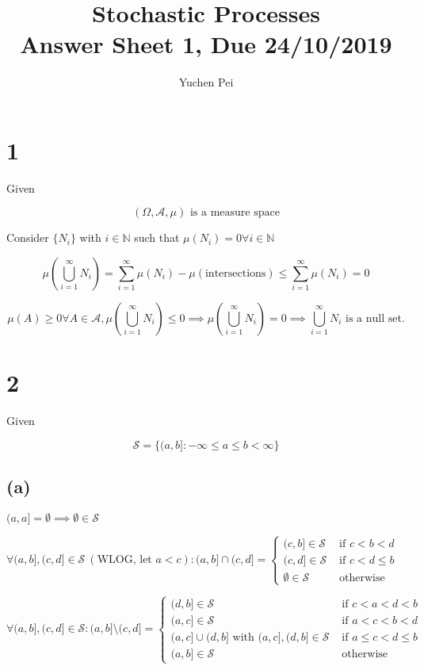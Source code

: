 

\title{Stochastic Processes\\{\small Answer Sheet 1, Due 24/10/2019}}
\author{Yuchen Pei}
\date{}


\maketitle




\section*{1}

Given

$$
(\Omega,\mathcal{A},\mu)\text{ is a measure space}
$$

Consider $\{N_i\}$ with $i\in\mathbb{N}$ such that $\mu(N_i)=0\forall i\in\mathbb{N}$

$$
\mu(\bigcup_{i=1}^{\infty}N_i)=\sum_{i=1}^{\infty}\mu(N_i)-\mu(\text{intersections})\leq\sum_{i=1}^{\infty}\mu(N_i)=0
$$

$$
\mu(A)\geq 0\forall A\in\mathcal{A},\mu(\bigcup_{i=1}^{\infty}N_i)\leq 0\implies\mu(\bigcup_{i=1}^{\infty}N_i)=0\implies \bigcup_{i=1}^{\infty}N_i\text{ is a null set.}
$$

\bigskip
\section*{2}

Given

$$
\mathcal{S}=\{
(a,b]:-\infty\leq a \leq b <\infty
\}
$$

\subsection*{(a)}

$(a,a]=\emptyset\implies\emptyset\in\mathcal{S}$

$
\forall(a,b],(c,d]\in\mathcal{S}\:(\text{WLOG, let }a<c):(a,b]\cap(c,d]=\left\{
\begin{array}{ll}
(c,b]\in\mathcal{S} &\text{ if }c<b<d
\\
(c,d]\in\mathcal{S} &\text{ if }c<d\leq b
\\
\emptyset\in\mathcal{S} &\text{ otherwise}
\end{array}
\right.
$

$
\forall(a,b],(c,d]\in\mathcal{S}:(a,b]\setminus(c,d]=\left\{
\begin{array}{ll}
(d,b]\in\mathcal{S} &\text{ if }c<a<d<b
\\
(a,c]\in\mathcal{S} &\text{ if }a<c<b<d
\\
(a,c]\cup(d,b] \text{ with } (a,c],(d,b]\in\mathcal{S} &\text{ if }a\leq c<d\leq b
\\
(a,b]\in\mathcal{S} & \text{ otherwise }
\end{array}
\right.
$

